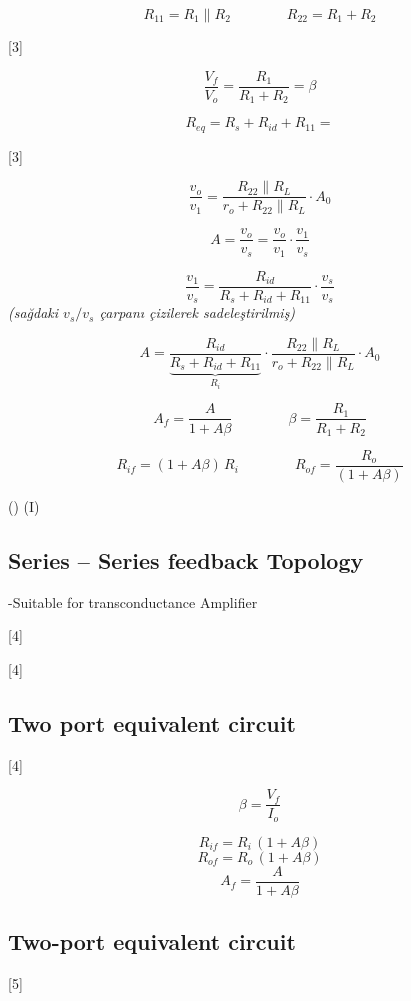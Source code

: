 \documentclass[11pt,a4paper]{article}
\begin{document}
\[ R_{11} = R_1 \parallel R_2 \qquad\qquad R_{22} = R_1 + R_2 \]

[3]

\[ \frac{V_f}{V_o} = \frac{R_1}{R_1+R_2} = \beta \]

\[ R_{eq} = R_s + R_{id} + R_{11} = \]

[3]

\[ \frac{v_o}{v_1} = \frac{R_{22} \parallel R_L}{r_o + R_{22} \parallel R_L}\cdot A_0 \]

\[ A = \frac{v_o}{v_s} = \frac{v_o}{v_1}\cdot\frac{v_1}{v_s} \]

\[ \frac{v_1}{v_s} = \frac{R_{id}}{R_s+R_{id}+R_{11}}\cdot\frac{v_s}{v_s} \]
\textit{(sağdaki $v_s/v_s$ çarpanı çizilerek sadeleştirilmiş)}

\[ A = \frac{R_{id}}{\underbrace{R_s+R_{id}+R_{11}}_{R_i}}\cdot\frac{R_{22} \parallel R_L}{r_o + R_{22} \parallel R_L}\cdot A_0 \]

\[ A_f = \frac{A}{1+A\beta} \qquad\qquad \beta = \frac{R_1}{R_1+R_2} \]

\[ R_{if} = (1+A\beta)\,R_i \qquad\qquad R_{of} = \frac{R_o}{(1+A\beta)} \]

\noindent () \qquad\quad (I)

\subsection{Series -- Series feedback Topology}
\noindent -Suitable for transconductance Amplifier

[4]

[4]

\subsection{Two port equivalent circuit}
[4]


\[ \beta = \frac{V_f}{I_o} \]

\[ R_{if} = R_i\,(1+A\beta) \]
\[ R_{of} = R_o\,(1+A\beta) \]
\[ A_f = \frac{A}{1+A\beta} \]

\subsection{Two-port equivalent circuit}
[5]
\end{document}
